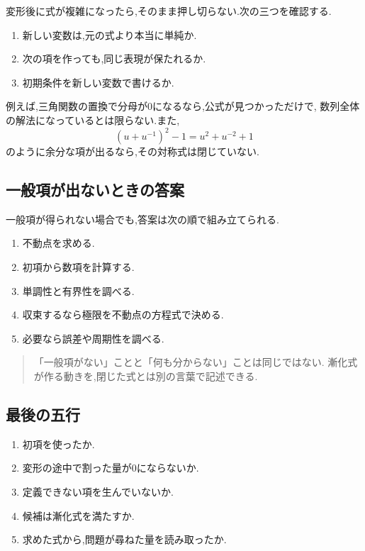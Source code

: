 変形後に式が複雑になったら,そのまま押し切らない.次の三つを確認する.

\begin{enumerate}
  \item 新しい変数は,元の式より本当に単純か.
  \item 次の項を作っても,同じ表現が保たれるか.
  \item 初期条件を新しい変数で書けるか.
\end{enumerate}

例えば,三角関数の置換で分母が0になるなら,公式が見つかっただけで,
数列全体の解法になっているとは限らない.また,
\[
  \left(u+u^{-1}\right)^2-1=u^2+u^{-2}+1
\]
のように余分な項が出るなら,その対称式は閉じていない.

\subsection{一般項が出ないときの答案}

一般項が得られない場合でも,答案は次の順で組み立てられる.

\begin{enumerate}
  \item 不動点を求める.
  \item 初項から数項を計算する.
  \item 単調性と有界性を調べる.
  \item 収束するなら極限を不動点の方程式で決める.
  \item 必要なら誤差や周期性を調べる.
\end{enumerate}

\begin{quote}
「一般項がない」ことと「何も分からない」ことは同じではない.
漸化式が作る動きを,閉じた式とは別の言葉で記述できる.
\end{quote}

\subsection{最後の五行}

\begin{enumerate}
  \item 初項を使ったか.
  \item 変形の途中で割った量が0にならないか.
  \item 定義できない項を生んでいないか.
  \item 候補は漸化式を満たすか.
  \item 求めた式から,問題が尋ねた量を読み取ったか.
\end{enumerate}
